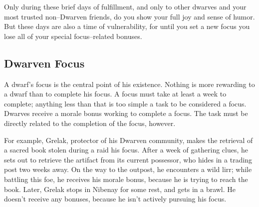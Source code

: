 \documentclass[10pt,a4paper,twocolumn]{d20}
\begin{document}
Only during these brief days of fulfillment, and only to other dwarves and your most trusted non–Dwarven friends, do you show your full joy and sense of humor. But these days are also a time of vulnerability, for until you set a new focus you lose all of your special focus–related bonuses.

\subsection{Dwarven Focus}

A dwarf’s focus is the central point of his existence. Nothing is more rewarding to a dwarf than to complete his focus. A focus must take at least a week to complete; anything less than that is too simple a task to be considered a focus. Dwarves receive a morale bonus working to complete a focus. The task must be directly related to the completion of the focus, however.

For example, Grelak, protector of his Dwarven community, makes the retrieval of a sacred book stolen during a raid his focus. After a week of gathering clues, he sets out to retrieve the artifact from its current possessor, who hides in a trading post two weeks away. On the way to the outpost, he encounters a wild lirr; while battling this foe, he receives his morale bonus, because he is trying to reach the book. Later, Grelak stops in Nibenay for some rest, and gets in a brawl. He doesn’t receive any bonuses, because he isn’t actively pursuing his focus.
\end{document}
